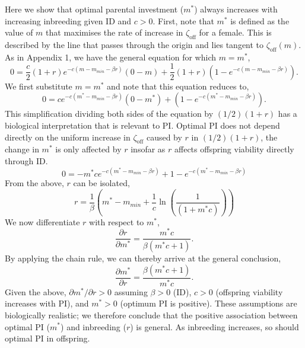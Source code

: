 \documentclass[12pt]{article}
\begin{document}
Here we show that optimal parental investment ($m^{*}$) always increases with increasing inbreeding given ID and $c>0$. First, note that $m^{*}$ is defined as the value of $m$ that maximises the rate of increase in $\zeta_{\textrm{off}}$ for a female. This is described by the line that passes through the origin and lies tangent to $\zeta_{\textrm{off}}(m)$. As in Appendix 1, we have the general equation for which $m=m^{*}$,
\begin{equation}
0 = \frac{c}{2} \left(1+r\right)e^{-c\left(m-m_{min}-\beta r\right)}\left(0-m\right) + \frac{1}{2}\left(1+r\right)\left(1-e^{-c\left(m-m_{min}-\beta r\right)}\right).
\end{equation}
We first substitute $m=m^{*}$ and note that this equation reduces to,
\begin{equation}
0 = c e^{-c\left(m^{*}-m_{min}-\beta r\right)}\left(0-m^{*}\right) + \left(1-e^{-c\left(m^{*}-m_{min}-\beta r\right)}\right). 
\end{equation}
This simplification dividing both sides of the equation by $(1/2)(1+r)$ has a biological interpretation that is relevant to PI. Optimal PI does not depend directly on the uniform increase in $\zeta_{\textrm{off}}$ caused by $r$ in $(1/2)(1+r)$, the change in $m^{*}$ is only affected by $r$ insofar as $r$ affects offspring viability directly through ID. 
\begin{equation}
0 = -m^{*} c e^{-c\left(m^{*}-m_{min}-\beta r\right)} + 1-e^{-c\left(m^{*}-m_{min}-\beta r\right)}
\end{equation}
From the above, $r$ can be isolated,
\begin{equation}
r = \frac{1}{\beta}\left(m^{*} - m_{min} + \frac{1}{c}\ln\left(\frac{1}{\left(1 + m^{*} c\right)}\right)\right)
\end{equation}
We now differentiate $r$ with respect to $m^{*}$,
\begin{equation}
\frac{\partial r}{\partial m^{*}} = \frac{m^{*} c}{\beta \left(m^{*} c + 1\right)}. 
\end{equation}
By applying the chain rule, we can thereby arrive at the general conclusion,
\begin{equation}
\frac{\partial m^{*}}{\partial r} = \frac{\beta \left(m^{*} c + 1\right)}{m^{*} c}. 
\end{equation} 
Given the above, $\partial m^{*} / \partial r > 0$ assuming $\beta>0$ (ID), $c>0$ (offspring viability increases with PI), and $m^{*}>0$ (optimum PI is positive). These assumptions are biologically realistic; we therefore conclude that the positive association between optimal PI ($m^{*}$) and inbreeding ($r$) is general. As inbreeding increases, so should optimal PI in offspring.
\end{document}

